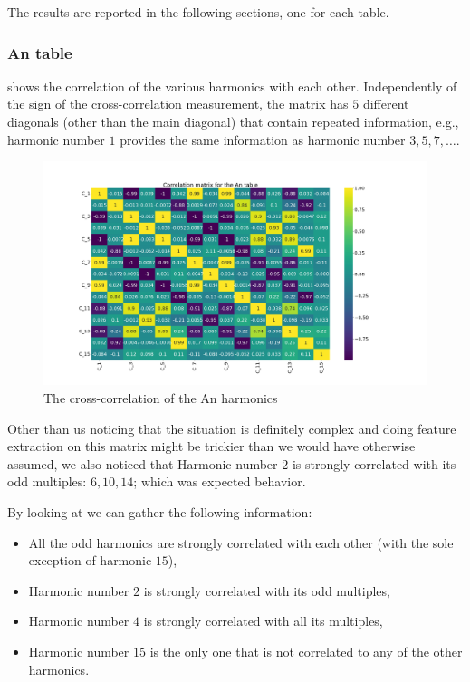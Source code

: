 The results are reported in the following sections, one for each table.

\subsubsection{An table}
 shows the correlation of the various harmonics with each other. Independently
of the sign of the cross-correlation measurement, the matrix has $5$ different diagonals (other than
the main diagonal) that contain repeated information, e.g., harmonic number $1$ provides the same
information as harmonic number $3, 5, 7, \ldots$.
\begin{figure}
	\centering
	\includegraphics[width=\linewidth]{img/An_corr_matrix.png}
	\caption{The cross-correlation of the An harmonics} \label{fig:an-corr}
\end{figure}
Other than us noticing that the situation is definitely complex and doing feature extraction on this
matrix might be trickier than we would have otherwise assumed, we also noticed that Harmonic number
$2$ is strongly correlated with its odd multiples: $6, 10, 14$; which was expected behavior.

By looking at  we can gather the following information:
\begin{itemize}
	\item All the odd harmonics are strongly correlated with each other (with the sole exception
	      of harmonic $15$),
	\item Harmonic number $2$ is strongly correlated with its odd multiples,
	\item Harmonic number $4$ is strongly correlated with all its multiples,
	\item Harmonic number $15$ is the only one that is not correlated to any of the other
	      harmonics.
\end{itemize}

